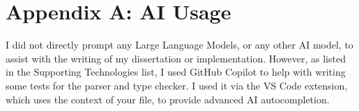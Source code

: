 \documentclass[
author={Kiran Sturt},
degree={BSc},
title={Implementing a Step by Step Evaluator for a Simple Functional Programming language},
unit={COMS30045},]{dissertation}
\begin{document}
\backmatter





\appendix

\chapter{Appendix A: AI Usage}
\label{appx:ai_prompt}

I did not directly prompt any Large Language Models, or any other AI model, to assist with the writing of my dissertation or implementation. However, as listed in the Supporting Technologies list, I used GitHub Copilot to help with writing some tests for the parser and type checker. I used it via the VS Code extension, which uses the context of your file, to provide advanced AI autocompletion.

\end{document}
